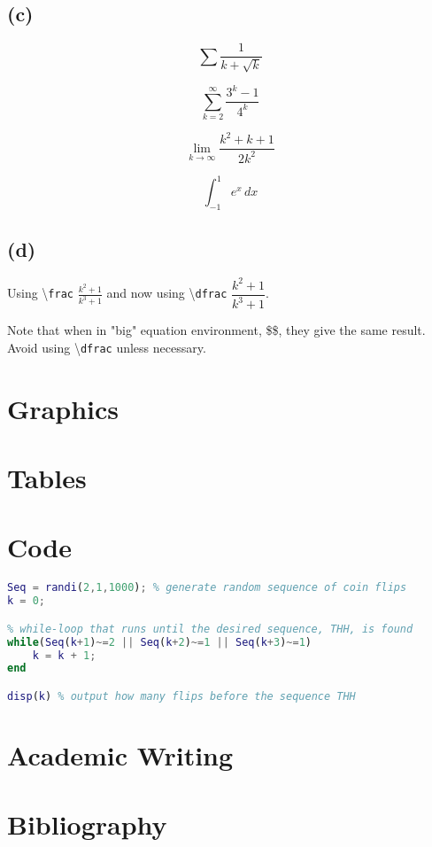 \documentclass[11pt, a4paper]{article}
\begin{document}
\subsection{(c)} %

$$\sum \frac{1}{k+\sqrt{k}}$$

$$\sum\limits_{k=2}^\infty \frac{3^k-1}{4^k}$$

$$\lim_{k \to \infty} \frac{k^2 + k + 1}{2k^2}$$

$$\int_{-1}^{1} e^{x} \, dx$$

\subsection{(d)} %

Using \textbackslash \texttt{frac} $\frac{k^2+1}{k^3+1}$ and now using \textbackslash \texttt{dfrac} $\dfrac{k^2+1}{k^3+1}$.

Note that when in "big" equation environment, \$\$, they give the same result. Avoid using \textbackslash \texttt{dfrac} unless necessary.


\section{Graphics}



\section{Tables}



\section{Code}

\begin{lstlisting}[language=MATLAB]
Seq = randi(2,1,1000); % generate random sequence of coin flips
k = 0;

% while-loop that runs until the desired sequence, THH, is found
while(Seq(k+1)~=2 || Seq(k+2)~=1 || Seq(k+3)~=1)
    k = k + 1;
end

disp(k) % output how many flips before the sequence THH
\end{lstlisting}




\section{Academic Writing}




\section{Bibliography}
\end{document}
